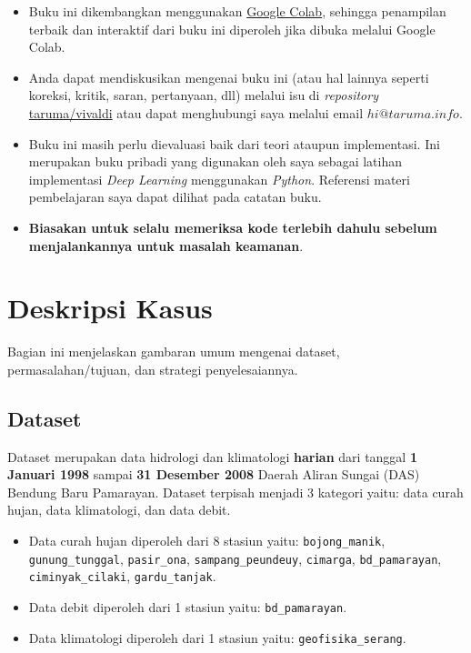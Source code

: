 \documentclass[11pt]{article}
\providecommand{\tightlist}{%
      \setlength{\itemsep}{0pt}\setlength{\parskip}{0pt}}
\let\oldsection\section
\renewcommand\section{\clearpage\oldsection}
\begin{document}
\begin{itemize}
\tightlist
\item
  Buku ini dikembangkan menggunakan
  \href{https://colab.research.google.com/}{Google Colab}, sehingga
  penampilan terbaik dan interaktif dari buku ini diperoleh jika dibuka
  melalui Google Colab.
\item
  Anda dapat mendiskusikan mengenai buku ini (atau hal lainnya seperti
  koreksi, kritik, saran, pertanyaan, dll) melalui isu di
  \emph{repository}
  \href{https://github.com/taruma/vivaldi}{taruma/vivaldi} atau dapat
  menghubungi saya melalui email \(hi@taruma.info\).
\item
  Buku ini masih perlu dievaluasi baik dari teori ataupun implementasi.
  Ini merupakan buku pribadi yang digunakan oleh saya sebagai latihan
  implementasi \emph{Deep Learning} menggunakan \emph{Python}. Referensi
  materi pembelajaran saya dapat dilihat pada catatan buku.
\item
  \textbf{Biasakan untuk selalu memeriksa kode terlebih dahulu sebelum
  menjalankannya untuk masalah keamanan}.
\end{itemize}

    \hypertarget{deskripsi-kasus}{%
\section{Deskripsi Kasus}\label{deskripsi-kasus}}

Bagian ini menjelaskan gambaran umum mengenai dataset,
permasalahan/tujuan, dan strategi penyelesaiannya.

    \hypertarget{dataset}{%
\subsection{Dataset}\label{dataset}}

Dataset merupakan data hidrologi dan klimatologi \textbf{harian} dari
tanggal \textbf{1 Januari 1998} sampai \textbf{31 Desember 2008} Daerah
Aliran Sungai (DAS) Bendung Baru Pamarayan. Dataset terpisah menjadi 3
kategori yaitu: data curah hujan, data klimatologi, dan data debit.

\begin{itemize}
\tightlist
\item
  Data curah hujan diperoleh dari 8 stasiun yaitu:
  \texttt{bojong\_manik}, \texttt{gunung\_tunggal}, \texttt{pasir\_ona},
  \texttt{sampang\_peundeuy}, \texttt{cimarga}, \texttt{bd\_pamarayan},
  \texttt{ciminyak\_cilaki}, \texttt{gardu\_tanjak}.
\item
  Data debit diperoleh dari 1 stasiun yaitu: \texttt{bd\_pamarayan}.
\item
  Data klimatologi diperoleh dari 1 stasiun yaitu:
  \texttt{geofisika\_serang}.
\end{itemize}
\end{document}

